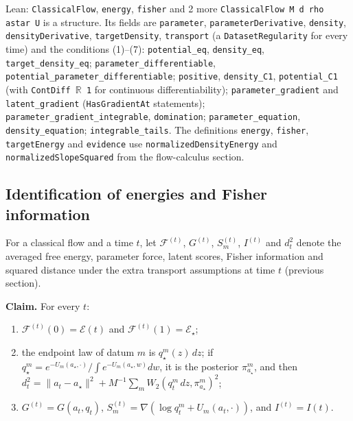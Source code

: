\documentclass[11pt,a4paper]{report}
\begin{document}
\begin{leanbox}{Lean: \texttt{ClassicalFlow}, \texttt{energy}, \texttt{fisher} and 2 more}
\texttt{Classical\allowbreak{}Flow M d rho astar U} is a structure. Its fields are \texttt{parameter}, \texttt{parameter\allowbreak{}Derivative}, \texttt{density}, \texttt{density\allowbreak{}Derivative}, \texttt{target\allowbreak{}Density}, \texttt{transport} (a \texttt{Dataset\allowbreak{}Regularity} for every time) and the conditions (1)–(7): \texttt{potential\_\allowbreak{}eq}, \texttt{density\_\allowbreak{}eq}, \texttt{target\_\allowbreak{}density\_\allowbreak{}eq}; \texttt{parameter\_\allowbreak{}differentiable}, \texttt{potential\_\allowbreak{}parameter\_\allowbreak{}differentiable}; \texttt{positive}, \texttt{density\_\allowbreak{}C1}, \texttt{potential\_\allowbreak{}C1} (with \texttt{Cont\allowbreak{}Diff \ensuremath{\mathbb R} 1} for continuous differentiability); \texttt{parameter\_\allowbreak{}gradient} and \texttt{latent\_\allowbreak{}gradient} (\texttt{Has\allowbreak{}Gradient\allowbreak{}At} statements); \texttt{parameter\_\allowbreak{}gradient\_\allowbreak{}integrable}, \texttt{domination}; \texttt{parameter\_\allowbreak{}equation}, \texttt{density\_\allowbreak{}equation}; \texttt{integrable\_\allowbreak{}tails}. The definitions \texttt{energy}, \texttt{fisher}, \texttt{target\allowbreak{}Energy} and \texttt{evidence} use \texttt{normalized\allowbreak{}Density\allowbreak{}Energy} and \texttt{normalized\allowbreak{}Slope\allowbreak{}Squared} from the flow-calculus section.
\end{leanbox}
\subsection{\texorpdfstring{Identification of energies and Fisher information}{Identification of energies and Fisher information}}


For a classical flow and a time \(t\), let \(\mathcal F^{(t)}\), \(G^{(t)}\), \(S^{(t)}_m\), \(I^{(t)}\) and \(d_t^2\) denote the averaged free energy, parameter force, latent scores, Fisher information and squared distance under the extra transport assumptions at time \(t\) (previous section).




\textbf{Claim.} For every \(t\):



\begin{enumerate}


\item \(\mathcal F^{(t)}(0)=\mathcal E(t)\) and \(\mathcal F^{(t)}(1)=\mathcal E_\star\);

\item the endpoint law of datum \(m\) is \(q_\star^m(z)\,dz\); if \(q_\star^m=e^{-U_m(a_\star,\cdot)}/\int e^{-U_m(a_\star,w)}dw\), it is the posterior \(\pi_{a_\star}^m\), and then \(d_t^2=\|a_t-a_\star\|^2+M^{-1}\sum_mW_2(q_t^m\,dz,\pi^m_{a_\star})^2\);

\item \(G^{(t)}=G(a_t,q_t)\), \(S^{(t)}_m=\nabla(\log q_t^m+U_m(a_t,\cdot))\), and \(I^{(t)}=I(t)\).

\end{enumerate}
\end{document}

